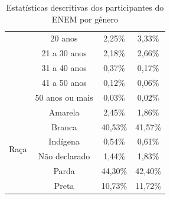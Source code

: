 \begin{table}[h]
\begin{tabular}{cccc}
    & 20 anos              & 2,25\%            & 3,33\%             \\ \cline{2-4} 
    & 21 a 30 anos              & 2,18\%            & 2,66\%             \\ \cline{2-4} 
    & 31 a 40 anos              & 0,37\%            & 0,17\%             \\ \cline{2-4}
    & 41 a 50 anos              & 0,12\%            & 0,06\%             \\ \cline{2-4} 
    & 50 anos ou mais           & 0,03\%            & 0,02\%             \\ \hline
    \multirow{7}{*}{Raça}                       & Amarela                   & 2,45\%            & 1,86\%             \\ \cline{2-4} 
                                                & Branca                    & 40,53\%           & 41,57\%            \\ \cline{2-4} 
                                                & Indígena                  & 0,54\%            & 0,61\%             \\ \cline{2-4} 
                                                & Não declarado             & 1,44\%            & 1,83\%             \\ \cline{2-4} 
                                                & Parda                     & 44,30\%           & 42,40\%            \\ \cline{2-4} 
                                                & Preta                     & 10,73\%           & 11,72\%                     \\ \hline
    \end{tabular}
    \caption{Estatísticas descritivas dos participantes do ENEM por gênero}
    \label{tab:estatistica-enem}
    \end{table}

